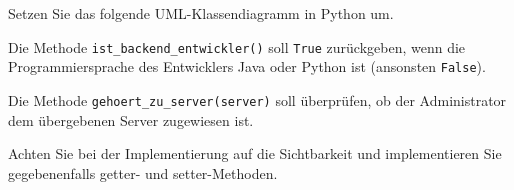\documentclass[11pt, a4paper, oneside]{article}
\begin{document}
	Setzen Sie das folgende UML-Klassendiagramm in Python um.
	
	\begin{figure}[h]
		\centering
	\end{figure}
	
	Die Methode \texttt{ist\_backend\_entwickler()} soll \texttt{True} zurückgeben, wenn die Programmiersprache des Entwicklers Java oder Python ist (ansonsten \texttt{False}).
	
	Die Methode \texttt{gehoert\_zu\_server(server)} soll überprüfen, ob der Administrator dem übergebenen Server zugewiesen ist.
	
	Achten Sie bei der Implementierung auf die Sichtbarkeit und implementieren Sie gegebenenfalls getter- und setter-Methoden.
	
\end{document}
